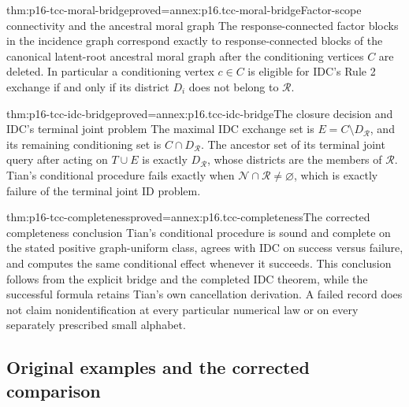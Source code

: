 \begin{hblemma}{thm:p16-tcc-moral-bridge}{proved=annex:p16.tcc-moral-bridge}{Factor-scope connectivity and the ancestral moral graph}
The response-connected factor blocks in the incidence graph correspond
exactly to response-connected blocks of the canonical latent-root
ancestral moral graph after the conditioning vertices \(C\) are deleted.
In particular a conditioning vertex \(c\in C\) is eligible
for IDC's Rule 2 exchange if and only if its district \(D_i\)
does not belong to \(\mathcal R\).
\end{hblemma}

\begin{hbtheorem}{thm:p16-tcc-idc-bridge}{proved=annex:p16.tcc-idc-bridge}{The closure decision and IDC's terminal joint problem}
The maximal IDC exchange set is
\(E=C\setminus D_{\mathcal R}\), and its remaining conditioning
set is \(C\cap D_{\mathcal R}\). The ancestor set of its
terminal joint query after acting on \(T\cup E\) is exactly
\(D_{\mathcal R}\), whose districts are the members of
\(\mathcal R\). Tian's conditional procedure fails exactly when
\(\mathcal N\cap\mathcal R\ne\varnothing\), which is
exactly failure of the terminal joint ID problem.
\end{hbtheorem}

\begin{hbcorollary}{thm:p16-tcc-completeness}{proved=annex:p16.tcc-completeness}{The corrected completeness conclusion}
Tian's conditional procedure is sound and complete on the stated
positive graph-uniform class, agrees with IDC on success versus failure,
and computes the same conditional effect whenever it succeeds.
This conclusion follows from the explicit bridge and the completed
IDC theorem, while the successful formula retains Tian's own cancellation
derivation. A failed record does not claim nonidentification at every
particular numerical law or on every separately prescribed small alphabet.
\end{hbcorollary}

\subsection{Original examples and the corrected comparison}

